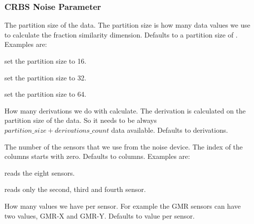 \label{sec:crbsnoise_project_parameter}
\subsubsection{CRBS Noise Parameter}

\label{par:crbsnoise_partition_size}

The partition size of the data. The partition size is how many
data values we use to calculate the fraction similarity dimension.
Defaults to a partition size of .
Examples are:
\begin{compactitem}
\item {} set the partition size to 16.
\item {} set the partition size to 32.
\item {} set the partition size to 64.
\end{compactitem}

\label{par:crbsnoise_derivations_count}

How many derivations we do with calculate. The derivation is calculated on
the partition size of the data. So it
needs to be always $partition\_size + derivations\_count$ data
available. Defaults to  derivations.

\label{par:crbsnoise_sensors}

The number of the sensors that we use from the noise device. The index of
the columns starts with zero. Defaults to  columns.
Examples are:
\begin{compactitem}
\item {} reads the eight sensors.
\item {} reads only the second, third and fourth sensor.
\end{compactitem}

\label{par:crbsnoise_values_per_sensor}

How many values we have per sensor. For example the GMR sensors can
have two values, GMR-X and GMR-Y. Defaults to  value per sensor.

\label{par:crbsnoise_data_calculus_factory}

